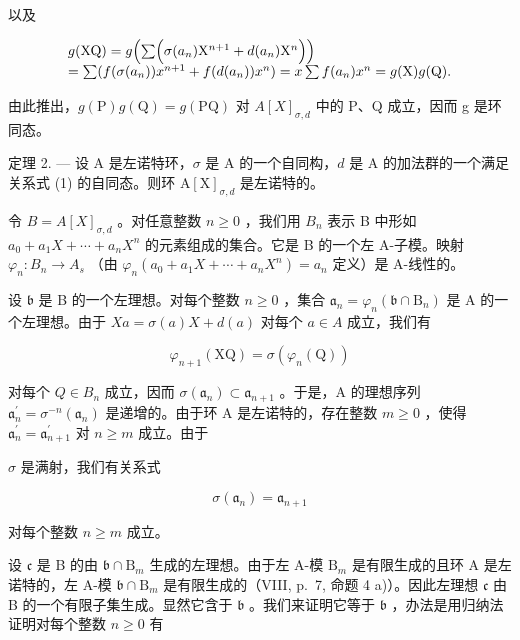 以及

\[
\begin{array}{l} g (\mathrm{XQ}) = g \Bigl (\sum \Bigl (\sigma (a _ {n}) \mathrm{X} ^ {n + 1} + d (a _ {n}) \mathrm{X} ^ {n} \Bigr) \Bigr) \\ = \sum (f (\sigma (a _ {n})) x ^ {n + 1} + f (d (a _ {n})) x ^ {n}) = x \sum f (a _ {n}) x ^ {n} = g (\mathrm{X}) g (\mathrm{Q}). \end{array}
\]

由此推出，\(g(\mathrm{P})g(\mathrm{Q}) = g(\mathrm{PQ})\) 对 \(A[X]_{\sigma,d}\) 中的 P、Q 成立，因而 g 是环同态。

定理 2. --- 设 A 是左诺特环，\(\sigma\) 是 A 的一个自同构，\(d\) 是 A 的加法群的一个满足关系式 (1) 的自同态。则环 \(\mathrm{A}[\mathrm{X}]_{\sigma,d}\) 是左诺特的。

令 \(B = A[X]_{\sigma,d}\) 。对任意整数 \(n \geqslant 0\) ，我们用 \(B_{n}\) 表示 B 中形如 \(a_{0} + a_{1}X + \cdots + a_{n}X^{n}\) 的元素组成的集合。它是 B 的一个左 A-子模。映射 \(\varphi_{n}: B_{n} \to A_{s}\) （由 \(\varphi_{n}(a_{0} + a_{1}X + \cdots + a_{n}X^{n}) = a_{n}\) 定义）是 A-线性的。

设 \(\mathfrak{b}\) 是 B 的一个左理想。对每个整数 \(n \geqslant 0\) ，集合 \(\mathfrak{a}_n = \varphi_n(\mathfrak{b} \cap \mathrm{B}_n)\) 是 A 的一个左理想。由于 \(Xa = \sigma(a)X + d(a)\) 对每个 \(a \in A\) 成立，我们有

\[
\varphi_ {n + 1} (\mathrm{XQ}) = \sigma (\varphi_ {n} (\mathrm{Q}))\tag{6}
\]

对每个 \(Q \in B_{n}\) 成立，因而 \(\sigma(\mathfrak{a}_{n}) \subset \mathfrak{a}_{n+1}\) 。于是，A 的理想序列 \(\mathfrak{a}_{n}^{\prime} = \sigma^{-n}(\mathfrak{a}_{n})\) 是递增的。由于环 A 是左诺特的，存在整数 \(m \geqslant 0\) ，使得 \(\mathfrak{a}_{n}^{\prime} = \mathfrak{a}_{n+1}^{\prime}\) 对 \(n \geqslant m\) 成立。由于

\(\sigma\) 是满射，我们有关系式

\[
\sigma (\mathfrak {a} _ {n}) = \mathfrak {a} _ {n + 1}\tag{7}
\]

对每个整数 \(n \geqslant m\) 成立。

设 \(\mathfrak{c}\) 是 B 的由 \(\mathfrak{b} \cap \mathrm{B}_m\) 生成的左理想。由于左 A-模 \(\mathrm{B}_m\) 是有限生成的且环 A 是左诺特的，左 A-模 \(\mathfrak{b} \cap \mathrm{B}_m\) 是有限生成的（VIII, p.~7, 命题 4 a)）。因此左理想 \(\mathfrak{c}\) 由 B 的一个有限子集生成。显然它含于 \(\mathfrak{b}\) 。我们来证明它等于 \(\mathfrak{b}\) ，办法是用归纳法证明对每个整数 \(n \geqslant 0\) 有

